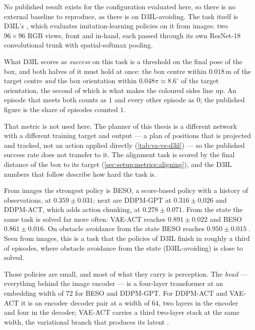 No published result exists for the configuration evaluated here, so there is no external baseline to
reproduce, as there is on D3IL-avoiding. The task itself is D3IL's \parencite{jia2024towards}, which
evaluates imitation-learning policies on it from images: two $96\times96$ RGB views, front and in-hand,
each passed through its own ResNet-18 convolutional trunk with spatial-softmax pooling.

What D3IL scores as \emph{success} on this task is a threshold on the final pose of the box, and both
halves of it must hold at once: the box centre within $0.018$\,m of the target centre \emph{and} the box
orientation within $0.048\pi \approx 8.6^{\circ}$ of the target orientation, the second of which is what
makes the coloured sides line up. An episode that meets both counts as $1$ and every other episode as $0$;
the published figure is the share of episodes counted $1$.

That metric is not used here. The planner of this thesis is a different network with a different
training target and output --- a plan of positions that is projected and tracked, not an action applied
directly (\autoref{tab:va-vs-d3il}) --- so the published success rate does not transfer to it. The
alignment task is scored by the final distance of the box to its target
(\autoref{sec:setup:metrics:aligning}), and the D3IL numbers that follow describe how hard the task is.

From images the strongest policy is BESO, a
score-based policy with a history of observations, at $0.359\pm0.031$; next are DDPM-GPT at
$0.316\pm0.026$ and DDPM-ACT, which adds action chunking, at $0.278\pm0.071$. From the state the same task
is solved far more often: VAE-ACT reaches $0.891\pm0.022$ and BESO $0.861\pm0.016$. On obstacle avoidance
from the state BESO reaches $0.950\pm0.015$ \parencite[Table~3]{jia2024towards}. Seen from images, this is a
task that the policies of D3IL finish in roughly a third of episodes, where obstacle avoidance from the
state (D3IL-avoiding) is close to solved.

Those policies are small, and most of what they carry is perception. The \emph{head} --- everything behind
the image encoder --- is a four-layer transformer at an embedding width of $72$ for BESO and DDPM-GPT. For
DDPM-ACT and VAE-ACT it is an encoder--decoder pair at a width of $64$, two layers in the encoder and four
in the decoder; VAE-ACT carries a third two-layer stack at the same width, the variational branch that
produces its latent \parencite[Table~9]{jia2024towards}.

